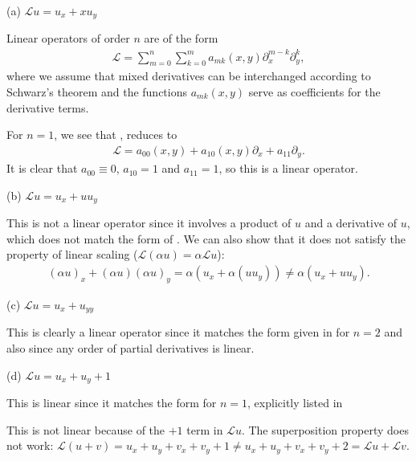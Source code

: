 \def\duedate{09/08/2022}
\def\HWnum{2}



    

(a) $\displaystyle \mathcal{L}u = u_{x} + x u_{y}$

Linear operators of order $n$ are of the form 
\begin{eqnarray}
    \label{eq:nth-lin-op}
    \mathcal{L} = \sum_{m=0}^{n} \sum_{k=0}^{m} a_{m k}(x,y) \partial_{x}^{m-k} \partial_{y}^{k}
,\end{eqnarray}
where we assume that mixed derivatives can be interchanged according to Schwarz's theorem and the functions $a_{m k}(x,y)$ serve as coefficients for the derivative terms.

For $n = 1$, we see that , reduces to
\begin{eqnarray}
    \label{eq:lin-op-1}
    \mathcal{L} = a_{00}(x,y) + a_{10}(x,y)\partial_{x} + a_{11}\partial_{y}
.\end{eqnarray}
It is clear that $a_{00} \equiv 0$, $a_{10} = 1$ and $a_{11} = 1$, so this is a linear operator.

(b) $\displaystyle \mathcal{L}u = u_{x} + u u_{y}$

This is not a linear operator since it involves a product of $u$ and a derivative of $u$, which does not match the form of .
We can also show that it does not satisfy the property of linear scaling ($\mathcal{L}(\alpha u) = \alpha \mathcal{L} u$):
\begin{eqnarray}
    \label{eq:disprove-b}
    (\alpha u)_{x} + (\alpha u)(\alpha u)_{y} = \alpha \left( u_{x} + \alpha (u u_{y}) \right) \ne \alpha (u_{x} + u u_{y})
.\end{eqnarray}


(c) $\displaystyle \mathcal{L}u = u_{x} + u_{yy}$

This is clearly a linear operator since it matches the form given in  for $n=2$ and also since any order of partial derivatives is linear.

(d) $\displaystyle \mathcal{L}u = u_{x} + u_{y} + 1$

This is linear since it matches the form  for $n=1$, explicitly listed in 

{
    \color{red} This is not linear because of the $+1$ term in $\mathcal{L} u$.
    The superposition property does not work: $\mathcal{L}(u+v) = u_{x} + u_{y} + v_{x} + v_{y} + 1 \ne u_{x} + u_{y} + v_{x} + v_{y} + 2 = \mathcal{L}u + \mathcal{L}v$.
}

